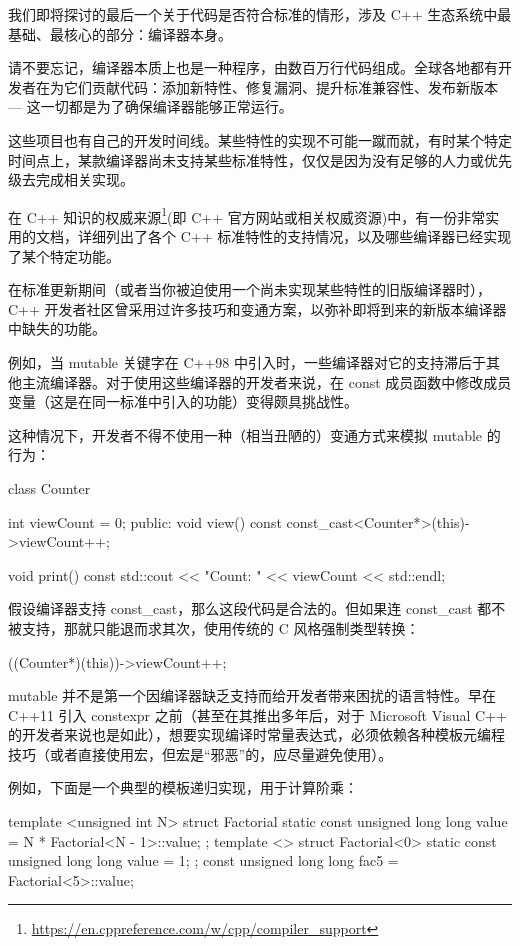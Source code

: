 我们即将探讨的最后一个关于代码是否符合标准的情形，涉及 C++ 生态系统中最基础、最核心的部分：编译器本身。

请不要忘记，编译器本质上也是一种程序，由数百万行代码组成。全球各地都有开发者在为它们贡献代码：添加新特性、修复漏洞、提升标准兼容性、发布新版本 --- 这一切都是为了确保编译器能够正常运行。

这些项目也有自己的开发时间线。某些特性的实现不可能一蹴而就，有时某个特定时间点上，某款编译器尚未支持某些标准特性，仅仅是因为没有足够的人力或优先级去完成相关实现。

在 C++ 知识的权威来源\footnote{\url{https://en.cppreference.com/w/cpp/compiler_support}}(即 C++ 官方网站或相关权威资源)中，有一份非常实用的文档，详细列出了各个 C++ 标准特性的支持情况，以及哪些编译器已经实现了某个特定功能。

在标准更新期间（或者当你被迫使用一个尚未实现某些特性的旧版编译器时），C++ 开发者社区曾采用过许多技巧和变通方案，以弥补即将到来的新版本编译器中缺失的功能。

例如，当 mutable 关键字在 C++98 中引入时，一些编译器对它的支持滞后于其他主流编译器。对于使用这些编译器的开发者来说，在 const 成员函数中修改成员变量（这是在同一标准中引入的功能）变得颇具挑战性。

这种情况下，开发者不得不使用一种（相当丑陋的）变通方式来模拟 mutable 的行为：

\begin{cpp}
class Counter {
  int viewCount = 0;
public:
  void view() const {
    const_cast<Counter*>(this)->viewCount++;
  }

  void print() const {
    std::cout << "Count: " << viewCount << std::endl;
  }
}
\end{cpp}

假设编译器支持 const\_cast，那么这段代码是合法的。但如果连 const\_cast 都不被支持，那就只能退而求其次，使用传统的 C 风格强制类型转换：

\begin{cpp}
((Counter*)(this))->viewCount++;
\end{cpp}

mutable 并不是第一个因编译器缺乏支持而给开发者带来困扰的语言特性。早在 C++11 引入 constexpr 之前（甚至在其推出多年后，对于 Microsoft Visual C++ 的开发者来说也是如此），想要实现编译时常量表达式，必须依赖各种模板元编程技巧（或者直接使用宏，但宏是“邪恶”的，应尽量避免使用）。

例如，下面是一个典型的模板递归实现，用于计算阶乘：

\begin{cpp}
template <unsigned int N>
struct Factorial {
  static const unsigned long long value = N * Factorial<N - 1>::value;
};
template <>
struct Factorial<0> {
  static const unsigned long long value = 1;
};
const unsigned long long fac5 = Factorial<5>::value;
\end{cpp}

